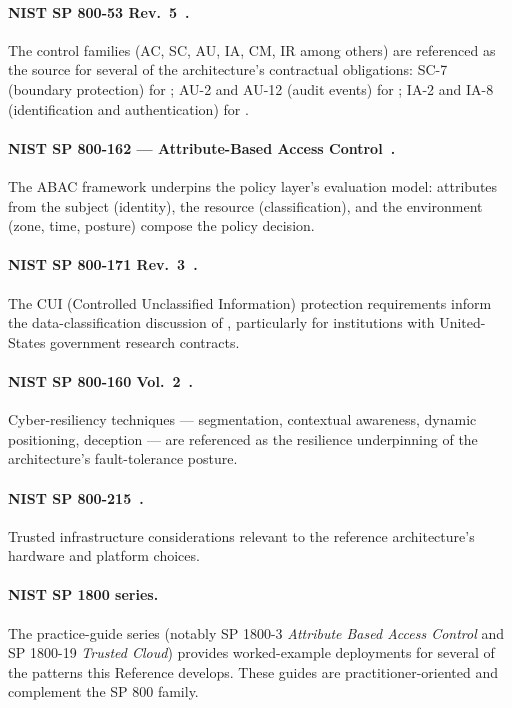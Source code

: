 \paragraph{NIST SP 800-53 Rev.~5~\cite{nist-sp800-53}.} The
control families (AC, SC, AU, IA, CM, IR among others) are
referenced as the source for several of the architecture's
contractual obligations: SC-7 (boundary protection) for
; AU-2 and AU-12 (audit events) for
; IA-2 and IA-8 (identification and
authentication) for .

\paragraph{NIST SP 800-162 --- Attribute-Based Access
Control~\cite{nist-sp800-162}.} The ABAC framework underpins the
policy layer's evaluation model: attributes from the subject
(identity), the resource (classification), and the environment
(zone, time, posture) compose the policy decision.

\paragraph{NIST SP 800-171 Rev.~3~\cite{nist-171r3}.} The CUI
(Controlled Unclassified Information) protection requirements
inform the data-classification discussion of
, particularly for institutions with
United-States government research contracts.

\paragraph{NIST SP 800-160 Vol.~2~\cite{nist-sp800-160v2}.}
Cyber-resiliency techniques --- segmentation, contextual
awareness, dynamic positioning, deception --- are referenced as
the resilience underpinning of the architecture's
fault-tolerance posture.

\paragraph{NIST SP 800-215~\cite{nist-sp800-215}.} Trusted
infrastructure considerations relevant to the reference
architecture's hardware and platform choices.

\paragraph{NIST SP 1800 series.} The practice-guide series
(notably SP 1800-3 \emph{Attribute Based Access Control} and
SP 1800-19 \emph{Trusted Cloud}) provides worked-example
deployments for several of the patterns this Reference develops.
These guides are practitioner-oriented and complement the
SP 800 family.

